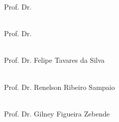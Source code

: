 \begin{folhaassinaturas}
{    \beginskip
    \signature{Orientador:}{Prof. Dr. \theadvisor} \\
    \InstituicaoMembro{}{\theuniversity} \\

    \sigskip
    \beginskip
    \signature{Co-orientador:}{Prof. Dr. \thecoadvisor} \\
     \\ %
    
    \sigskip
    \beginskip
    \signature{Membro externo da Banca:}{Prof. Dr. Felipe Tavares da Silva} \\
     \\


    \sigskip
    \beginskip
   	\signature{Membro interno da Banca:}{Prof. Dr. Renelson Ribeiro Sampaio} \\
   	\InstituicaoMembro{}{\theuniversity} \\
   	
   	\sigskip
   	    \beginskip
   	   	\signature{Membro interno da Banca:}{Prof. Dr. Gilney Figueira Zebende} \\
   	   	\InstituicaoMembro{}{\theuniversity} \\
   	

    \vfill
    \newpage
    \setcounter{page}{3}
}


\signaturepage


\end{folhaassinaturas}
